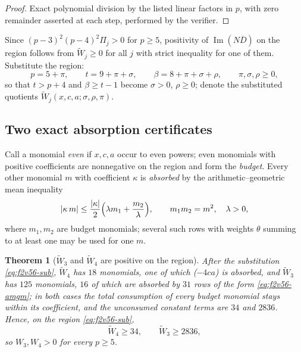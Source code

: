 \documentclass[11pt]{article}
\newtheorem{theorem}{Theorem}[section]
\theoremstyle{definition}
\theoremstyle{remark}
\begin{document}
\begin{proof}
Exact polynomial division by the listed linear factors in \(p\), with
zero remainder asserted at each step, performed by the verifier.
\end{proof}

Since \((p-3)^2(p-4)^2\Pi_j>0\) for \(p\ge5\), positivity of
\(\operatorname{Im}(N\overline D)\) on the region follows from
\(\widetilde W_j\ge0\) for all \(j\) with strict inequality for one of
them.  Substitute the region:
\begin{equation}
 p=5+\pi,\qquad t=9+\pi+\sigma,\qquad \beta=8+\pi+\sigma+\rho,
 \qquad \pi,\sigma,\rho\ge0,
 \label{eq:f2v56-sub}
\end{equation}
so that \(t>p+4\) and \(\beta\ge t-1\) become \(\sigma>0\), \(\rho\ge0\);
denote the substituted quotients \(\widetilde W_j(x,c,a;\sigma,\rho,\pi)\).

\subsection{Two exact absorption certificates}

Call a monomial \emph{even} if \(x,c,a\) occur to even powers; even
monomials with positive coefficients are nonnegative on the region and
form the \emph{budget}.  Every other monomial \(m\) with coefficient
\(\kappa\) is \emph{absorbed} by the arithmetic--geometric mean
inequality
\begin{equation}
 |\kappa\,m|\le\frac{|\kappa|}2\Bigl(\lambda m_1+\frac{m_2}\lambda\Bigr),
 \qquad m_1m_2=m^2,\quad\lambda>0,
 \label{eq:f2v56-amgm}
\end{equation}
where \(m_1,m_2\) are budget monomials; several such rows with weights
\(\theta\) summing to at least one may be used for one \(m\).

\begin{theorem}[\(\widetilde W_3\) and \(\widetilde W_4\) are positive on the region]
\label{thm:f2v56-W34}
After the substitution \eqref{eq:f2v56-sub}, \(\widetilde W_4\) has
\(18\) monomials, one of which (\(-4ca\)) is absorbed, and
\(\widetilde W_3\) has \(125\) monomials, \(16\) of which are absorbed
by \(31\) rows of the form \eqref{eq:f2v56-amgm}; in both cases the total
consumption of every budget monomial stays within its coefficient, and
the unconsumed constant terms are \(34\) and \(2836\).  Hence, on the
region \eqref{eq:f2v56-sub},
\begin{equation}
 \widetilde W_4\ge34,\qquad \widetilde W_3\ge2836,
 \label{eq:f2v56-bounds}
\end{equation}
so \(W_3,W_4>0\) for every \(p\ge5\).
\end{theorem}
\end{document}
